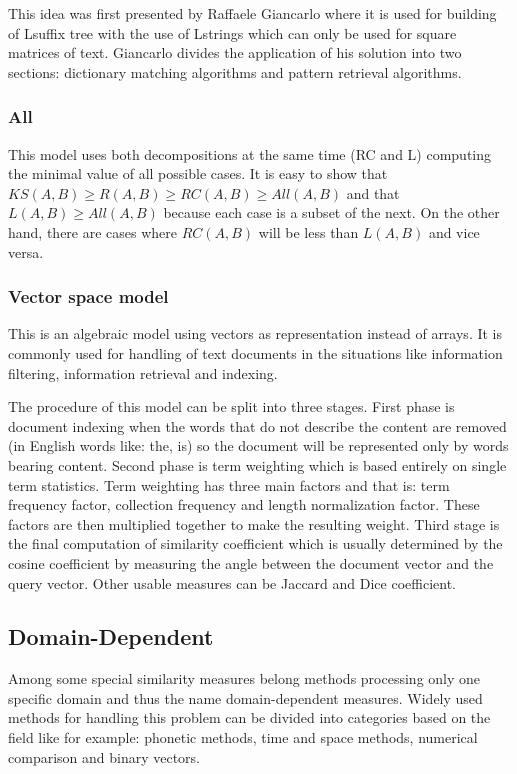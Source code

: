 This idea was first presented by Raffaele Giancarlo \cite{lshape} where it is used for building of Lsuffix tree with the use of Lstrings which can only be used for square matrices of text. Giancarlo divides the application of his solution into two sections: dictionary matching algorithms and pattern retrieval algorithms.

\subsubsection{All}
This model uses both decompositions at the same time (RC and L) computing the minimal value of all possible cases. It
is easy to show that $KS(A,B) \geq R(A,B) \geq RC(A,B) \geq All(A,B)$ and that $L(A,B) \geq All(A,B) $ because each case is a subset of the next. On the other hand, there are cases where $RC(A,B)$ will be less than $L(A,B)$ and vice versa. \cite{mdApproxPM}


\subsubsection{Vector space model}
This is an algebraic model using vectors as representation instead of arrays. It is commonly used for handling of text documents in the situations like information filtering, information retrieval and indexing.

The procedure of this model can be split into three stages. First phase is document indexing when the words that do not describe the content are removed (in English words like: the, is) so the document will be represented only by words bearing content. Second phase is term weighting which is based entirely on single term statistics. Term weighting has three main factors and that is: term frequency factor, collection frequency and length normalization factor. These factors are then multiplied together to make the resulting weight. Third stage is the final computation of similarity coefficient which is usually determined by the cosine coefficient by measuring the angle between the document vector and the query vector. Other usable measures can be Jaccard and Dice coefficient.

\subsection{Domain-Dependent}
Among some special similarity measures belong methods processing only one specific domain and thus the name domain-dependent measures.
Widely used methods for handling this problem can be divided into categories based on the field like for example: phonetic methods, time and space methods, numerical comparison and binary vectors. 

